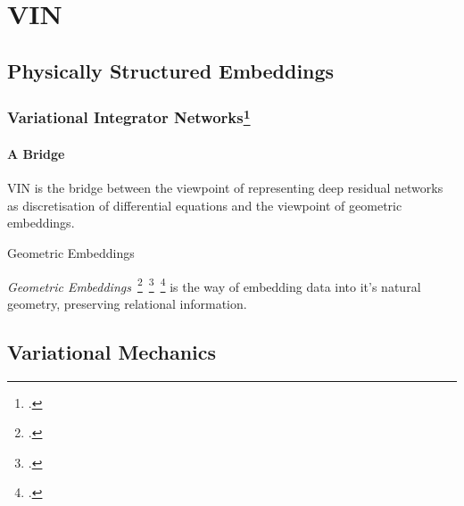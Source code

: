 \documentclass[
    11pt, %
    aspectratio=169, ]{beamer}%
\begin{document}
\section{VIN}

\subsection{Physically Structured Embeddings}

\begin{frame}
    \frametitle{Variational Integrator Networks\footcite{saemundssonVariationalIntegratorNetworks2020}}
    \framesubtitle{A Bridge}

    VIN is the bridge between the viewpoint of representing deep residual networks
    as discretisation of differential equations and the viewpoint of geometric
    embeddings.

    \begin{block}{Geometric Embeddings}

        \textit{Geometric Embeddings}~\footcite{chamberlainNeuralEmbeddingsGraphs2017}~\footcite{davidsonHypersphericalVariationalAutoEncoders2022}~\footcite{xiongGeometricRelationalEmbeddings2023} is the way of embedding data into it's natural geometry, preserving relational information.

    \end{block}

\end{frame}

\subsection{Variational Mechanics}
\end{document}
